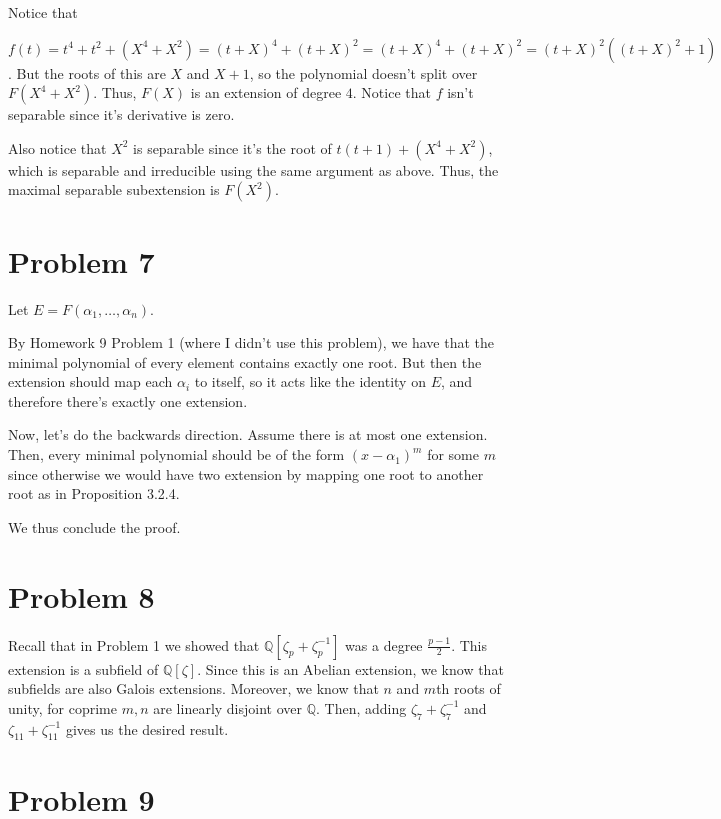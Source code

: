 \documentclass{article}
\theoremstyle{definition}
\begin{document}
Notice that 

$ f(t) = t^{4} + t^{2} + (X^{4} + X^{2}) = (t + X)^{4} + (t + X)^{2} = (t + X)^{4} + (t + X)^{2} = (t + X)^{2}((t + X)^{2} + 1) $.
But the roots of this are $ X $ and $ X + 1 $, so the polynomial doesn't split over $ F(X^{4} + X^{2}) $.
Thus, $ F(X) $ is an extension of degree $ 4 $. Notice that $ f $ isn't separable since it's
derivative is zero.

Also notice that $ X^{2} $ is separable since it's the root
of $ t(t + 1) + (X^{4} + X^{2}) $, which is separable and irreducible using the same argument as above.
Thus, the maximal separable subextension is $ F(X^{2}) $.

\section{Problem 7}

Let $ E = F(\alpha_{1}, \ldots, \alpha_{n}) $.

By Homework 9 Problem 1 (where I didn't use this problem), we have that
the minimal polynomial of every element contains exactly one root. But then the extension should
map each $ \alpha_{i} $ to itself, so it acts like the identity on $ E $, and therefore there's
exactly one extension.

Now, let's do the backwards direction. Assume there is at most one extension. Then, every
minimal polynomial should be of the form $ (x - \alpha_{1})^{m}  $ for some $ m $ since otherwise
we would have two extension by mapping one root to another root as in Proposition 3.2.4.

We thus conclude the proof.

\section{Problem 8}

Recall that in Problem 1 we showed that $ \mathbb{Q}[\zeta_{p} + \zeta_{p}^{-1}] $ was a degree
$ \frac{p - 1}{2} $. This extension is a subfield of $ \mathbb{Q}[\zeta] $. Since this
is an Abelian extension, we know that subfields are also Galois extensions. Moreover, we know that
$ n $ and $ m $th roots of unity, for coprime $ m,n $ are linearly disjoint over $ \mathbb{Q} $.
Then, adding $ \zeta_{7} + \zeta_{7}^{-1} $ and $ \zeta_{11} + \zeta_{11}^{-1} $ gives us the desired result.

\section{Problem 9}
\end{document}
